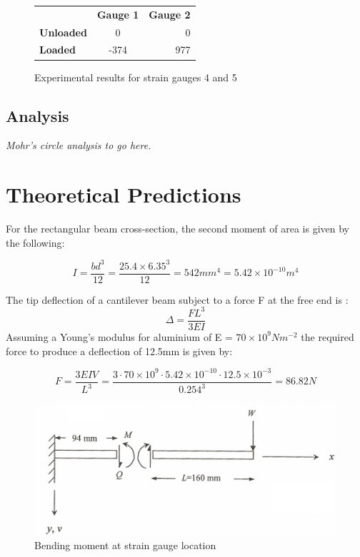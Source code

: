 \documentclass[12pt]{article}
\begin{document}
\begin{figure}[ht]
\begin{center}
\begin{tabular}{l | c | r}

 & \textbf{Gauge 1} & \textbf{Gauge 2} \\
 \textbf{Unloaded} & 0 & 0  \\
 \textbf{Loaded} & -374 & 977 \\

\end{tabular}
\end{center}
\caption{\label{results2} Experimental results for strain gauges 4 and 5}
\end{figure}


\subsection{Analysis}

\emph{Mohr's circle analysis to go here.}

\section{Theoretical Predictions}

For the rectangular beam cross-section, the second moment of area is given by the following:

\begin{equation}
I = \frac{bd^3}{12} = \frac{25.4 \times 6.35^3}{12} = 542mm^4 = 5.42\times 10^{-10} m^4
\end{equation}

The tip deflection of a cantilever beam subject to a force F at the free end is \cite{mechengmat}:
\begin{equation}
\Delta = \frac{FL^3}{3EI}
\end{equation}
Assuming a Young's modulus for aluminium of E = $70\times 10^9 Nm^{-2}$ the required force to produce a deflection of 12.5mm is given by:

\begin{equation}
F = \frac{3EIV}{L^3} = \frac{3 \cdot 70 \times 10^9  \cdot 5.42 \times 10^{-10} \cdot 12.5 \times 10^{-3}}{0.254^3} = 86.82N
\end{equation}

\begin{figure}[ht]
\begin{center}


\includegraphics[width=\linewidth]{bending}
\caption{\label{bending}Bending moment at strain gauge location}
\end{center}
\end{figure}
\end{document}
